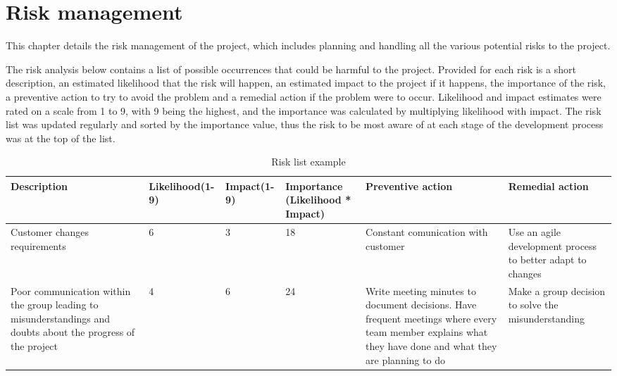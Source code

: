 
\chapter{Risk management}
\label{chap:risk_management}

This chapter details the risk management of the project, which includes planning and handling all the various potential risks to the project.\newline

The risk analysis below contains a list of possible occurrences that could be harmful to the project. Provided for each risk is a short description, an estimated likelihood that the risk will happen, an estimated impact to the project if it happens, the importance of the risk, a preventive action to try to avoid the problem and a remedial action if the problem were to occur. Likelihood and impact estimates were rated on a scale from 1 to 9, with 9 being the highest, and the importance was calculated by multiplying likelihood with impact. The risk list was updated regularly and sorted by the importance value, thus the risk to be most aware of at each stage of the development process was at the top of the list.

\begin{center}
	\begin{longtable}{ | p{3.5cm} | p{2cm} | p{1.5cm} | p{2cm} | p{3.5cm} | p{3.5cm}|}
		
		\caption[Risk list example]{Risk list example } \label{Tab:riskexample}\\
		\hline
		\textbf{Description} & \textbf{Likelihood(1-9)} & \textbf{Impact(1-9)} & \textbf{Importance (Likelihood * Impact)} & \textbf{Preventive action} & \textbf{Remedial action}\\ \hline
		
		Customer changes requirements & 6 & 3 & 18 & Constant comunication with customer & Use an agile development process to better adapt to changes \\\hline 
		
		Poor communication within the group leading to misunderstandings and doubts about the progress of the project & 4 & 6 & 24 & Write meeting minutes to document decisions. Have frequent meetings where every team member explains what they have done and what they are planning to do & Make a group decision to solve the misunderstanding \\ \hline
	\end{longtable}
\end{center}
		

\cleardoublepage